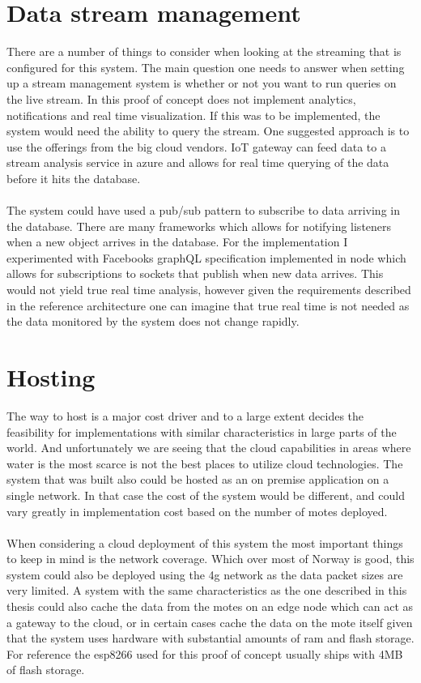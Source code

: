 \documentclass[]{uiophd}
\begin{document}
\section{Data stream management}
There are a number of things to consider when looking at the streaming that is configured for this system. The main question one needs to answer when setting up a stream management system is whether or not you want to run queries on the live stream. In this proof of concept does not implement analytics, notifications and real time visualization. If this was to be implemented, the system would need the ability to query the stream. One suggested approach is to use the offerings from the big cloud vendors. IoT gateway can feed data to a stream analysis service in azure and allows for real time querying of the data before it hits the database.
\\\\
The system could have used a pub/sub pattern to subscribe to data arriving in the database. There are many frameworks which allows for notifying listeners when a new object arrives in the database. For the implementation I experimented with Facebooks graphQL specification implemented in node which allows for subscriptions to sockets that publish when new data arrives. This would not yield true real time analysis, however given the requirements described in the reference architecture one can imagine that true real time is not needed as the data monitored by the system does not change rapidly.

\section{Hosting}
The way to host is a major cost driver and to a large extent decides the feasibility for implementations with similar characteristics in large parts of the world. And unfortunately we are seeing that the cloud capabilities in areas where water is the most scarce is not the best places to utilize cloud technologies. The system that was built also could be hosted as an on premise application on a single network. In that case the cost of the system would be different, and could vary greatly in implementation cost based on the number of motes deployed.
\\\\
When considering a cloud deployment of this system the most important things to keep in mind is the network coverage. Which over most of Norway is good, this system could also be deployed using the 4g network as the data packet sizes are very limited. A system with the same characteristics as the one described in this thesis could also cache the data from the motes on an edge node which can act as a gateway to the cloud, or in certain cases cache the data on the mote itself given that the system uses hardware with substantial amounts of ram and flash storage. For reference the esp8266 used for this proof of concept usually ships with 4MB of flash storage. \cite{espressif}
\end{document}
